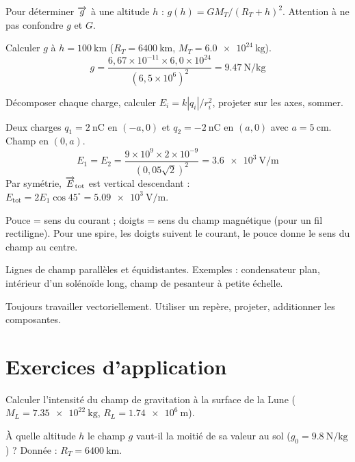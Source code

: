 Pour déterminer $\overrightarrow{g}$ à une altitude $h$ : $g(h) = G M_T/(R_T + h)^2$. Attention à ne pas confondre $g$ et $G$.

\begin{exemple}
Calculer $g$ à $h = \SI{100}{\kilo\metre}$ ($R_T = \SI{6400}{\kilo\metre}$, $M_T = \SI{6.0e24}{\kilogram}$).
\[
g = \frac{6,67\times10^{-11}\times6,0\times10^{24}}{(6,5\times10^{6})^2} = \SI{9.47}{\newton\per\kilogram}
\]
\end{exemple}

Décomposer chaque charge, calculer $E_i = k|q_i|/r_i^2$, projeter sur les axes, sommer.

\begin{exemple}
Deux charges $q_1 = \SI{2}{\nano\coulomb}$ en $(-a,0)$ et $q_2 = \SI{-2}{\nano\coulomb}$ en $(a,0)$ avec $a = \SI{5}{\centi\metre}$. Champ en $(0,a)$.
\[
E_1 = E_2 = \frac{9\times10^9\times2\times10^{-9}}{(0,05\sqrt{2})^2} = \SI{3.6e3}{\volt\per\metre}
\]
Par symétrie, $\overrightarrow{E}_{\text{tot}}$ est vertical descendant : $E_{\text{tot}} = 2E_1\cos45^\circ = \SI{5.09e3}{\volt\per\metre}$.
\end{exemple}

Pouce = sens du courant ; doigts = sens du champ magnétique (pour un fil rectiligne). Pour une spire, les doigts suivent le courant, le pouce donne le sens du champ au centre.

Lignes de champ parallèles et équidistantes. Exemples : condensateur plan, intérieur d’un solénoïde long, champ de pesanteur à petite échelle.

Toujours travailler vectoriellement. Utiliser un repère, projeter, additionner les composantes.

\section{Exercices d’application}


\exo{} Calculer l’intensité du champ de gravitation à la surface de la Lune ($M_L = \SI{7.35e22}{\kilogram}$, $R_L = \SI{1.74e6}{\metre}$).

\exo{} À quelle altitude $h$ le champ $g$ vaut-il la moitié de sa valeur au sol ($g_0 = \SI{9.8}{\newton\per\kilogram}$) ? Donnée : $R_T = \SI{6400}{\kilo\metre}$.


